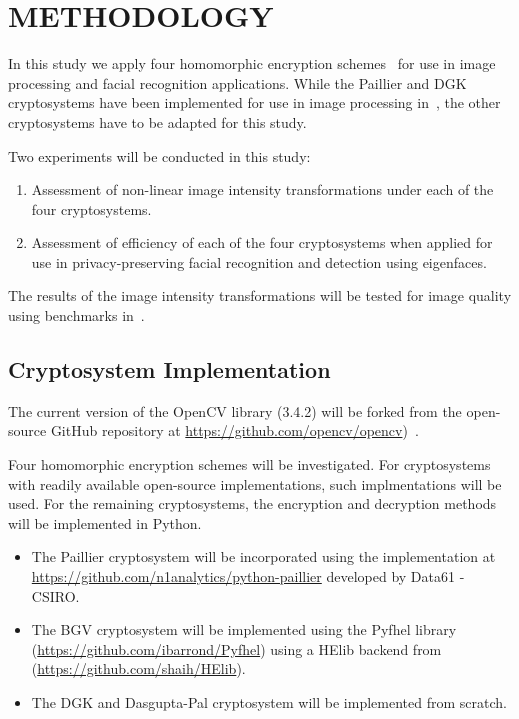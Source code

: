 \chapter{METHODOLOGY}

In this study we apply four homomorphic encryption schemes~\cite{ziad_cryptoimg:_2016, pieprzyk_efficient_2007, dasgupta_design_2016, garay_algorithms_2014} for use in image processing and facial recognition applications.
While the Paillier and DGK cryptosystems have been implemented for use in image processing in~\cite{ziad_cryptoimg:_2016, hutchison_privacy-preserving_2009}, the other cryptosystems have to be adapted for this study.

Two experiments will be conducted in this study:
\begin{enumerate}
	\item Assessment of non-linear image intensity transformations under each of the four cryptosystems.
	\item Assessment of efficiency of each of the four cryptosystems when applied for use in privacy-preserving facial recognition and detection using eigenfaces.
\end{enumerate}
The results of the image intensity transformations will be tested for image quality using benchmarks in~\cite{ahmed_benchmark_2016}.

\section{Cryptosystem Implementation}

The current version of the OpenCV library (3.4.2) will be forked from the open-source GitHub repository at \url{https://github.com/opencv/opencv})~\cite{bradski_opencv_2000}.

Four homomorphic encryption schemes will be investigated. For cryptosystems with readily available open-source implementations, such implmentations will be used. For the remaining cryptosystems, the encryption and decryption methods will be implemented in Python.
\begin{itemize}
	\item The Paillier cryptosystem will be incorporated using the implementation at \url{https://github.com/n1analytics/python-paillier} developed by Data61 - CSIRO.
	\item The BGV cryptosystem will be implemented using the Pyfhel library (\url{https://github.com/ibarrond/Pyfhel}) using a HElib backend from (\url{https://github.com/shaih/HElib}).
	\item The DGK and Dasgupta-Pal cryptosystem will be implemented from scratch.
\end{itemize}

